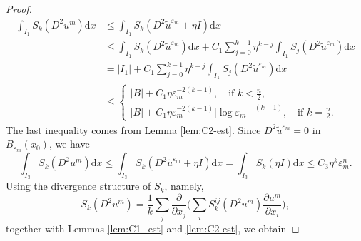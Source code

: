 \documentclass[reqno]{amsart}
\theoremstyle{remark}
\theoremstyle{definition}
\numberwithin{equation}{section}
\begin{document}
\begin{proof}
\begin{equation}\label{eq:I1}
\begin{aligned}
\int_{I_1} S_k(D^2 u^m) \mathrm{d}x &\le \int_{I_1} S_k(D^2 \tilde{u}^{\varepsilon_m} + \eta I) \mathrm{d}x \\
&\le \int_{I_1} S_k(D^2 \tilde{u}^{\varepsilon_m}) \mathrm{d}x + C_1 \sum_{j=0}^{k-1} \eta^{k-j} \int_{I_1} S_j(D^2 \tilde{u}^{\varepsilon_m}) \mathrm{d}x \\
&= |I_1| + C_1 \sum_{j=0}^{k-1} \eta^{k-j} \int_{I_1} S_j(D^2 \tilde{u}^{\varepsilon_m}) \mathrm{d}x \\
&\le \begin{cases} 
|B| + C_1 \eta \varepsilon_m^{-2(k-1)}, \quad \text{if } k < \frac{n}{2}, \\[1ex]
|B| + C_1 \eta \varepsilon_m^{-2(k-1)} |\log \varepsilon_m|^{-(k-1)}, \quad \text{if } k = \frac{n}{2}. 
\end{cases}
\end{aligned}
\end{equation}
The last inequality comes from Lemma \ref{lem:C2-est}. 
Since $D^2\tilde{u}^{\varepsilon_m}=0$ in $B_{\varepsilon_m}(x_0)$,  we have
\begin{equation}\label{eq:I3}
	\int_{I_3} S_k(D^2u^m) \mathrm{d}x \leq \int_{I_3}S_k(D^2 \tilde{u}^{\varepsilon_m} + \eta I) \mathrm{d}x = \int_{I_3}S_k(\eta I) \mathrm{d}x\leq C_3\eta^k\varepsilon_m^n.
\end{equation}
Using the divergence structure of $S_k$, namely,
\[S_k(D^2u^m)=\frac{1}{k}\sum_{j}\frac{\partial}{\partial x_j}\bigg(\sum_i   S_k^{ij}(D^2u^m)\frac{\partial u^m}{\partial x_i}\bigg),\]
together with Lemmas \ref{lem:C1_est} and \ref{lem:C2-est}, we obtain

\end{proof}
\end{document}
